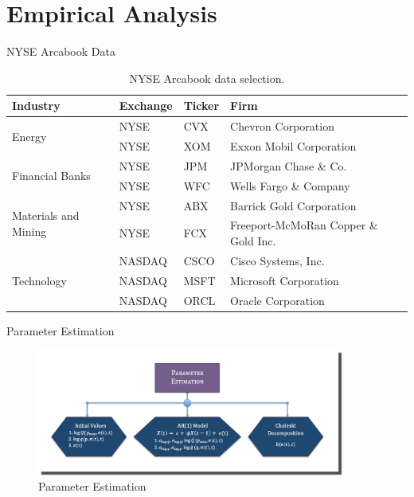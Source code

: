 \documentclass{beamer}
\begin{document}
\section{Empirical Analysis}
\begin{frame}[shrink=35]{{\color{cyan}NYSE Arcabook Data}}
\bigskip
\begin{table}[H]
\begin{center}
\begin{tabular}{llll}
\hline
\textbf{Industry} & \textbf{Exchange} & \textbf{Ticker} & \textbf{Firm}\\ 
\hline \hline

\multirow{2}{*}{Energy} & NYSE & CVX & Chevron Corporation\\
 & NYSE & XOM & Exxon Mobil Corporation\\
 
\hline
\multirow{2}{*}{Financial Banks} & NYSE & JPM & JPMorgan Chase \& Co.\\
 & NYSE & WFC & Wells Fargo \& Company \\ 
 
 \hline
 \multirow{2}{*}{Materials and Mining} & NYSE & ABX & Barrick Gold Corporation \\
 & NYSE & FCX & Freeport-McMoRan Copper \& Gold Inc. \\
 
 \hline
 \multirow{3}{*}{Technology} & NASDAQ & CSCO & Cisco Systems, Inc. \\
 & NASDAQ & MSFT & Microsoft Corporation \\
 & NASDAQ & ORCL & Oracle Corporation \\
\hline
\end{tabular}
\end{center}
\caption{NYSE Arcabook data selection.}
\label{table:NYSE_Arcabook_Selection}
\end{table}

\end{frame}

\begin{frame}[shrink=35]{{\color{cyan}Parameter Estimation}}
\bigskip
\begin{figure}[htbp]
                \centering
                \includegraphics[width=0.9\textwidth]{Parameter_Estimation.png}
                \caption{Parameter Estimation}
                \label{fig:parameter_estimation}
\end{figure}

\end{frame}
\end{document}
